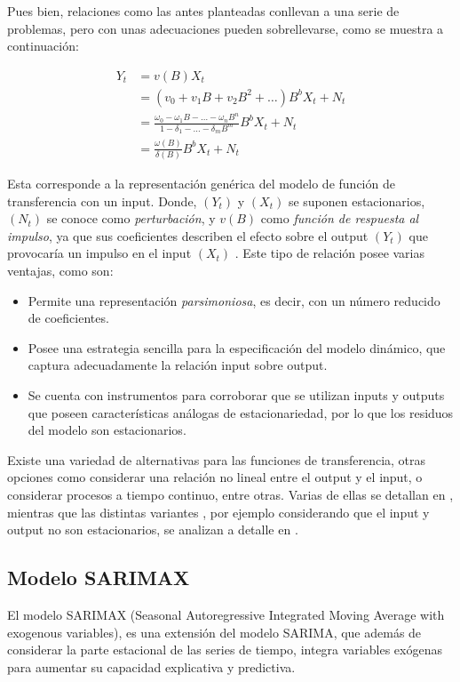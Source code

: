 \documentclass[12pt,oneside]{book}\usepackage[]{graphicx}\usepackage[]{color}
\theoremstyle{definition} %
\begin{document}
Pues bien, relaciones como las antes planteadas conllevan a una serie de problemas, pero con unas adecuaciones pueden sobrellevarse, como se muestra a continuación:

\begin{equation} \label{eq:fun_transfer}
\begin{split}
Y_t & = v(B)X_t \\
&  =  (v_0+v_1B+v_2B^2+\dots )B^b X_t + N_t \\
&  = \frac{\omega_0-\omega_1B- \dots -\omega_n B^n}{1-\delta_1-\dots -\delta_m B^m} B^b X_t + N_t \\
& = \frac{\omega(B)}{\delta(B)}B^b X_t + N_t
\end{split}
\end{equation}

Esta corresponde a la representación genérica del modelo de función de transferencia con un input. Donde, $(Y_t)$ y $(X_t)$ se suponen estacionarios,  $(N_t)$ se conoce como \textit{perturbación}, y $v(B)$ como \textit{función de respuesta al impulso}, ya que sus coeficientes describen el efecto sobre el output $(Y_t)$ que provocaría un impulso en el input $(X_t)$ . Este tipo de relación posee varias ventajas, como son:

\begin{itemize}
\item Permite una representación \textit{parsimoniosa}, es decir, con un número reducido de coeficientes.
\item Posee una estrategia sencilla para la especificación del modelo dinámico, que captura adecuadamente la relación input sobre output.
\item Se cuenta con instrumentos para corroborar que se utilizan inputs y outputs que poseen características análogas de estacionariedad, por lo que los residuos del modelo son estacionarios.
\end{itemize} 

Existe una variedad de alternativas para las funciones de transferencia, otras opciones como considerar una relación no lineal entre el output y el input, o considerar procesos a tiempo continuo, entre otras. Varias de ellas se detallan en \cite[Capitulo~5]{box2015time}, mientras que las distintas variantes , por ejemplo considerando que el input y output no son estacionarios, se analizan a detalle en \cite{pankratz2012forecasting}.



\subsection{Modelo SARIMAX}
El modelo SARIMAX (Seasonal Autoregressive Integrated Moving Average with exogenous variables), es una extensión del modelo SARIMA, que además de considerar la parte estacional de las series de tiempo, integra variables exógenas para aumentar su capacidad explicativa y predictiva. 
\end{document}
